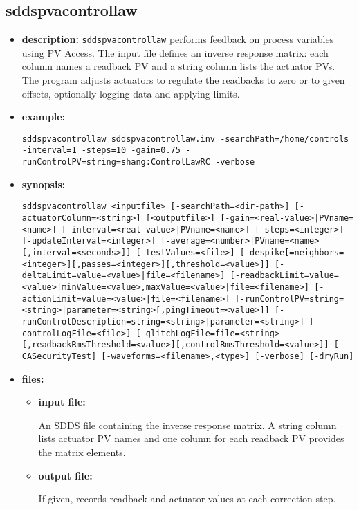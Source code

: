 %
%
\begin{latexonly}
\newpage
\end{latexonly}

\subsection{sddspvacontrollaw}
\label{sddspvacontrollaw}

\begin{itemize}
\item {\bf description:}
\verb+sddspvacontrollaw+ performs feedback on process variables using PV Access. The
input file defines an inverse response matrix: each column names a readback PV and a
string column lists the actuator PVs. The program adjusts actuators to regulate the
readbacks to zero or to given offsets, optionally logging data and applying limits.

\item {\bf example:}
\begin{flushleft}{\tt sddspvacontrollaw sddspvacontrollaw.inv -searchPath=/home/controls -interval=1 -steps=10 -gain=0.75 -runControlPV=string=shang:ControlLawRC -verbose}\end{flushleft}

\item {\bf synopsis:}
\begin{flushleft}{\tt sddspvacontrollaw <inputfile> [-searchPath=<dir-path>] [-actuatorColumn=<string>] [<outputfile>] [-gain={<real-value>|PVname=<name>}] [-interval={<real-value>|PVname=<name>}] [-steps=<integer>] [-updateInterval=<integer>] [-average={<number>|PVname=<name>}[,interval=<seconds>]] [-testValues=<file>] [-despike[=neighbors=<integer>][,passes=<integer>][,threshold=<value>]] [-deltaLimit={value=<value>|file=<filename>}] [-readbackLimit={value=<value>|minValue=<value>,maxValue=<value>|file=<filename>}] [-actionLimit={value=<value>|file=<filename>}] [-runControlPV={string=<string>|parameter=<string>}[,pingTimeout=<value>]] [-runControlDescription={string=<string>|parameter=<string>}] [-controlLogFile=<file>] [-glitchLogFile=file=<string>[,readbackRmsThreshold=<value>][,controlRmsThreshold=<value>]] [-CASecurityTest] [-waveforms=<filename>,<type>] [-verbose] [-dryRun]}\end{flushleft}

\item {\bf files:}
  \begin{itemize}
  \item {\bf input file:} \par
    An SDDS file containing the inverse response matrix. A string column lists actuator PV names and one column for each readback PV provides the matrix elements.
  \item {\bf output file:} \par
    If given, records readback and actuator values at each correction step.
  \end{itemize}


\end{itemize}
